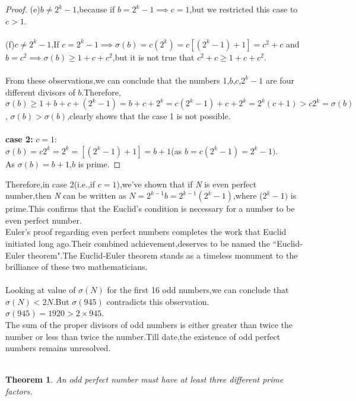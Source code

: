 \documentclass[a4paper,reqno,11pt]{book}
\theoremstyle{plain}%
\newtheorem{thm}{Theorem}[chapter]
\theoremstyle{definition}
\begin{document}
\begin{proof}
(e)$b\neq2^k-1$,because if $b=2^k-1\implies c=1$,but we restricted this case to $c>1$.\\
\\
(f)$c\neq2^k-1$,If $c=2^k-1\implies\sigma(b)=c(2^k)=c[(2^k-1)+1]=c^2+c$ and $b=c^2\implies\sigma(b)\geq1+c+c^2$,but it is not true that $c^2+c\geq1+c+c^2$.\\
\\
From these observations,we can conclude that the numbers 1,$b$,$c$,$2^k-1$ are four different divisors of $b$.Therefore,\\
$\sigma(b)\geq1+b+c+(2^k-1)=b+c+2^k=c(2^k-1)+c+2^k=2^k(c+1)>c2^k=\sigma(b)$,
$\sigma(b)>\sigma(b)$,clearly shows that the case 1 is not possible.\\
\\
\textbf{case 2:} $c=1$:\\
$\sigma(b)=c2^k=2^k=[(2^k-1)+1]=b+1$(as $b=c(2^k-1)=2^k-1)$.\\
As $\sigma(b)=b+1$,$b$ is prime.
\end{proof}
Therefore,in case 2(i.e.,if $c=1$),we've shown that if \textit{N} is even perfect number,then \textit{N} can be written as $N=2^{k-1}b=2^{k-1}(2^k-1)$,where ($2^k-1)$ is prime.This confirms that the Euclid's condition is necessary for a number to be even perfect number.\\
Euler's proof regarding even perfect numbers completes the work that Euclid initiated long ago.Their combined achievement,deserves to be named the ``Euclid-Euler theorem".The Euclid-Euler theorem stands as a timeless monument to the brilliance of these two mathematicians.\\
\\
Looking at value of $\sigma(N)$ for the first 16 odd numbers,we can conclude that $\sigma(N)<2N$.But $\sigma(945)$ contradicts this observation.
$\sigma(945)=1920>2\times945$.\\
The sum of the proper divisors of odd numbers is either greater than twice the number or less than twice the number.Till date,the existence of odd perfect numbers remains unresolved.\\
\\
\begin{thm}\label{thm:Type 3} \textit{An odd perfect number must have at least three different prime factors.}
\end{thm}
\end{document}
